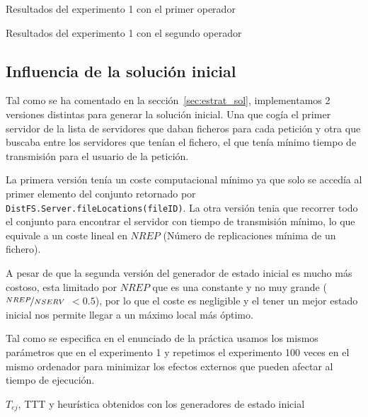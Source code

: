 \begin{table}[H]
    \caption{Resultados del experimento 1 con el primer operador}%
    \label{tab:ex1a}
    \begin{center}
    
    \end{center}
    \caption{Resultados del experimento 1 con el segundo operador}%
    \label{tab:ex1b}
    \begin{center}
    
    \end{center}
\end{table}


\subsection{Influencia de la solución inicial}

Tal como se ha comentado en la sección~\ref{sec:estrat_sol}, implementamos 2 versiones distintas
para generar la solución inicial. Una que cogía el primer servidor de la lista de servidores que daban ficheros
para cada petición y otra que buscaba entre los servidores que tenían el fichero, el que tenía mínimo
tiempo de transmisión para el usuario de la petición.

La primera versión tenía un coste computacional mínimo ya que solo se accedía al primer elemento del
conjunto retornado por \texttt{DistFS.Server.fileLocations(fileID)}. La otra versión tenia que recorrer
todo el conjunto para encontrar el servidor con tiempo de transmisión mínimo, lo que equivale a un coste
lineal en $NREP$ (Número de replicaciones mínima de un fichero).

\begin{hyp*}
A pesar de que la segunda versión del generador de estado inicial es mucho más costoso, esta limitado
por $NREP$ que es una constante y no muy grande ($\nicefrac{NREP}{NSERV}$ $<0.5$), por lo que el coste es negligible
y el tener un mejor estado inicial nos permite llegar a un máximo local más óptimo.
\end{hyp*}

Tal como se especifica en el enunciado de la práctica usamos los mismos parámetros que en el experimento
1 y repetimos el experimento 100 veces en el mismo ordenador para minimizar los efectos externos que
pueden afectar al tiempo de ejecución.

\begin{table}[H]
    \caption{$T_{ej}$, TTT y heurística obtenidos con los generadores de estado inicial}%
    \label{tab:ex2}
    \begin{center}
    
    \end{center}
\end{table}

